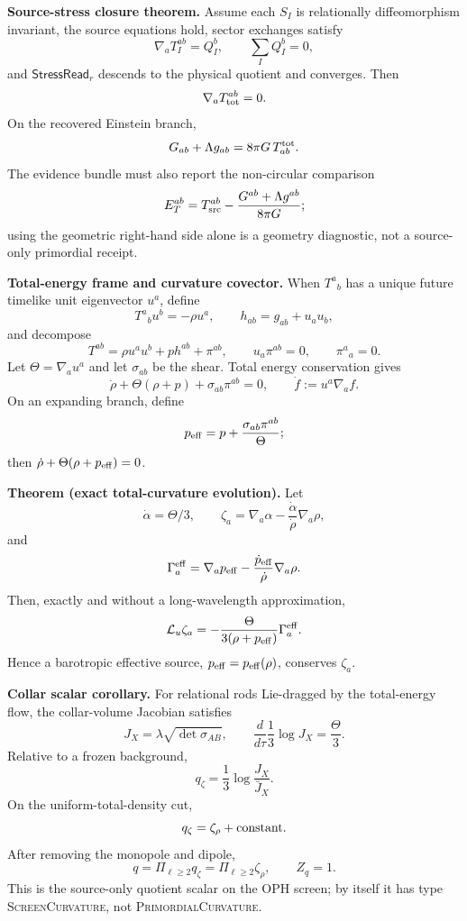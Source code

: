 \textbf{Source-stress closure theorem.}\label{thm:oph-source-stress-closure}
Assume each \(S_I\) is relationally diffeomorphism invariant, the source
equations hold, sector exchanges satisfy
\[
\nabla_aT_I^{ab}=Q_I^b,\qquad \sum_I Q_I^b=0,
\]
and \(\mathsf{StressRead}_r\) descends to the physical quotient and converges.
Then
\[
\nabla_aT_{\rm tot}^{ab}=0.
\]
On the recovered Einstein branch,
\[
G_{ab}+\Lambda g_{ab}=8\pi G\,T^{\rm tot}_{ab}.
\]
The evidence bundle must also report the non-circular comparison
\[
E_T^{ab}=
T_{\rm src}^{ab}
-
\frac{G^{ab}+\Lambda g^{ab}}{8\pi G};
\]
using the geometric right-hand side alone is a geometry diagnostic, not a
source-only primordial receipt.

\textbf{Total-energy frame and curvature covector.}
When \(T^a{}_b\) has a unique future timelike unit eigenvector \(u^a\), define
\[
T^a{}_bu^b=-\rho u^a,\qquad
h_{ab}=g_{ab}+u_au_b,
\]
and decompose
\[
T^{ab}=\rho u^au^b+p h^{ab}+\pi^{ab},
\qquad
u_a\pi^{ab}=0,\qquad \pi^a{}_a=0.
\]
Let \(\Theta=\nabla_a u^a\) and let \(\sigma_{ab}\) be the shear.  Total
energy conservation gives
\[
\dot\rho+\Theta(\rho+p)+\sigma_{ab}\pi^{ab}=0,
\qquad
\dot f:=u^a\nabla_a f.
\]
On an expanding branch, define
\[
p_{\rm eff}=p+\frac{\sigma_{ab}\pi^{ab}}{\Theta};
\]
then \(\dot\rho+\Theta(\rho+p_{\rm eff})=0\).

\textbf{Theorem (exact total-curvature evolution).}\label{thm:oph-total-curvature-evolution}
Let
\[
\dot\alpha=\Theta/3,\qquad
\zeta_a=\nabla_a\alpha-\frac{\dot\alpha}{\dot\rho}\nabla_a\rho,
\]
and
\[
\Gamma^{\rm eff}_a=
\nabla_a p_{\rm eff}
-
\frac{\dot p_{\rm eff}}{\dot\rho}\nabla_a\rho .
\]
Then, exactly and without a long-wavelength approximation,
\[
\mathcal L_u\zeta_a
=
-\frac{\Theta}{3(\rho+p_{\rm eff})}\Gamma^{\rm eff}_a .
\]
Hence a barotropic effective source, \(p_{\rm eff}=p_{\rm eff}(\rho)\),
conserves \(\zeta_a\).

\textbf{Collar scalar corollary.}\label{cor:oph-collar-curvature}
For relational rods Lie-dragged by the total-energy flow, the collar-volume
Jacobian satisfies
\[
J_X=\lambda\sqrt{\det\sigma_{AB}},
\qquad
\frac{d}{d\tau}\frac13\log J_X=\frac{\Theta}{3}.
\]
Relative to a frozen background,
\[
q_\zeta=\frac13\log\frac{J_X}{\bar J_X}.
\]
On the uniform-total-density cut,
\[
q_\zeta=\zeta_\rho+\hbox{constant}.
\]
After removing the monopole and dipole,
\[
q=\Pi_{\ell\ge2}q_\zeta=\Pi_{\ell\ge2}\zeta_\rho,
\qquad
Z_q=1.
\]
This is the source-only quotient scalar on the OPH screen; by itself it has type
\textsc{ScreenCurvature}, not \textsc{PrimordialCurvature}.


